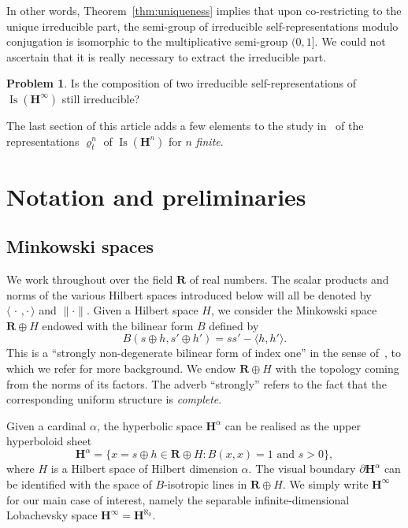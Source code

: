 \documentclass[11pt]{article}
\theoremstyle{definition}
\numberwithin{equation}{section}
\numberwithin{figure}{section}
\numberwithin{table}{section}
\newtheorem*{iprob*}{Problem}
\newcommand{\sH}{H}
\newcommand{\RR}{\mathbf{R}}
\newcommand{\HH}{\mathbf{H}}
\newcommand{\HHI}{\mathbf{H}^{\infty}}
\newcommand{\Isomi}{{\Isom}(\HHI)}
\DeclareMathOperator{\Isom}{Is}
\newcommand{\ro}{\varrho}
\begin{document}
In other words, Theorem~\ref{thm:uniqueness} implies that upon co-restricting to the unique irreducible part, the semi-group of irreducible self-representations modulo conjugation is isomorphic to the multiplicative semi-group $(0,1]$. We could not ascertain that it is really necessary to extract the irreducible part.

\begin{iprob*}
Is the composition of two irreducible self-representations of $\Isomi$ still irreducible?
\end{iprob*}

The last section of this article adds a few elements to the study in~\cite{Monod-Py} of the representations $\ro^n_t$ of $\Isom(\HH^n)$ for $n$ \emph{finite}.


\section{Notation and preliminaries}\label{sec:prelim}

\subsection{Minkowski spaces}\label{sec:Minkowski}

We work throughout over the field $\RR$ of real numbers. The scalar products and norms of the various Hilbert spaces introduced below will all be denoted by ${\langle{\,\cdot\,, \cdot\,}\rangle}$ and ${\|\cdot\|}$. Given a Hilbert space $\sH$, we consider the Minkowski space $\RR\oplus \sH$ endowed with the bilinear form $B$ defined by
\[
B(s\oplus h, s'\oplus h') = s s' - \langle h,h'\rangle.
\]
This is a ``strongly non-degenerate bilinear form of index one'' in the sense of~\cite{Burger-Iozzi-Monod}, to which we refer for more background. We endow $\RR\oplus \sH$ with the topology coming from the norms of its factors. The adverb ``strongly'' refers to the fact that the corresponding uniform structure is \emph{complete}.

Given a cardinal $\alpha$, the hyperbolic space $\HH^\alpha$ can be realised as the upper hyperboloid sheet
\[
\HH^\alpha=\big\{x=s\oplus h \in \RR\oplus \sH : B(x,x) = 1 \text{ and } s > 0\big\},
\]
where $\sH$ is a Hilbert space of Hilbert dimension $\alpha$. The visual boundary $\partial\HH^\alpha$ can be identified with the space of $B$-isotropic lines in $\RR\oplus \sH$. We simply write $\HHI$ for our main case of interest, namely the separable infinite-dimensional Lobachevsky space $\HHI=\HH^{\aleph_0}$.
\end{document}
